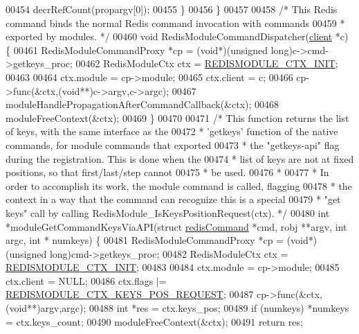 \begin{DoxyCode}
{00454         decrRefCount(propargv[0]);
00455     \}
00456 \}
00457 
00458 \textcolor{comment}{/* This Redis command binds the normal Redis command invocation with commands}
00459 \textcolor{comment}{ * exported by modules. */}
00460 \textcolor{keywordtype}{void} RedisModuleCommandDispatcher(\hyperlink{structclient}{client} *c) \{
00461     RedisModuleCommandProxy *cp = (\textcolor{keywordtype}{void}*)(\textcolor{keywordtype}{unsigned} \textcolor{keywordtype}{long})c->cmd->getkeys\_proc;
00462     RedisModuleCtx ctx = \hyperlink{module_8c_a7a80fb134c35b70c7cfe920ea1033bcd}{REDISMODULE\_CTX\_INIT};
00463 
00464     ctx.module = cp->module;
00465     ctx.client = c;
00466     cp->func(&ctx,(\textcolor{keywordtype}{void}**)c->argv,c->argc);
00467     moduleHandlePropagationAfterCommandCallback(&ctx);
00468     moduleFreeContext(&ctx);
00469 \}
00470 
00471 \textcolor{comment}{/* This function returns the list of keys, with the same interface as the}
00472 \textcolor{comment}{ * 'getkeys' function of the native commands, for module commands that exported}
00473 \textcolor{comment}{ * the "getkeys-api" flag during the registration. This is done when the}
00474 \textcolor{comment}{ * list of keys are not at fixed positions, so that first/last/step cannot}
00475 \textcolor{comment}{ * be used.}
00476 \textcolor{comment}{ *}
00477 \textcolor{comment}{ * In order to accomplish its work, the module command is called, flagging}
00478 \textcolor{comment}{ * the context in a way that the command can recognize this is a special}
00479 \textcolor{comment}{ * "get keys" call by calling RedisModule\_IsKeysPositionRequest(ctx). */}
00480 \textcolor{keywordtype}{int} *moduleGetCommandKeysViaAPI(\textcolor{keyword}{struct} \hyperlink{structredisCommand}{redisCommand} *cmd, robj **argv, \textcolor{keywordtype}{int} argc, \textcolor{keywordtype}{int} *
      numkeys) \{
00481     RedisModuleCommandProxy *cp = (\textcolor{keywordtype}{void}*)(\textcolor{keywordtype}{unsigned} \textcolor{keywordtype}{long})cmd->getkeys\_proc;
00482     RedisModuleCtx ctx = \hyperlink{module_8c_a7a80fb134c35b70c7cfe920ea1033bcd}{REDISMODULE\_CTX\_INIT};
00483 
00484     ctx.module = cp->module;
00485     ctx.client = NULL;
00486     ctx.flags |= \hyperlink{module_8c_a235c576b70301827b2d69fd909b191d9}{REDISMODULE\_CTX\_KEYS\_POS\_REQUEST};
00487     cp->func(&ctx,(\textcolor{keywordtype}{void}**)argv,argc);
00488     \textcolor{keywordtype}{int} *res = ctx.keys\_pos;
00489     \textcolor{keywordflow}{if} (numkeys) *numkeys = ctx.keys\_count;
00490     moduleFreeContext(&ctx);
00491     \textcolor{keywordflow}{return} res;
}
\end{DoxyCode}
